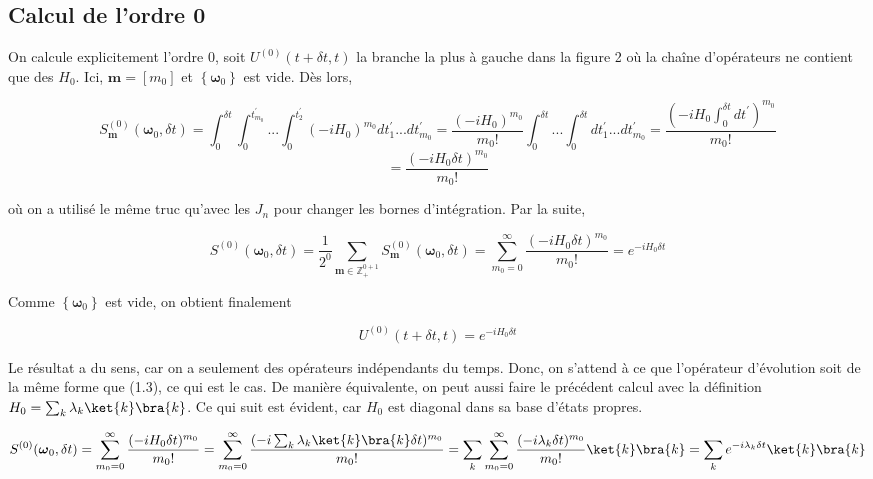 \subsection{Calcul de l'ordre 0}
On calcule explicitement l'ordre 0, soit $U^{(0)}(t+\delta t, t)$ la branche la plus à gauche dans la figure 2 où la chaîne d'opérateurs ne contient que des $H_0$. Ici, $\boldsymbol{m} = [m_0]$ et $\left\{\boldsymbol{\omega}_0\right\}$ est vide. Dès lors,

\begin{equation*}
    S^{(0)}_{\boldsymbol{m}}(\boldsymbol{\omega}_0, \delta t) = \int_{0}^{\delta t}\int_{0}^{t_{m_0}^{'}}...\int_{0}^{t_2^{'}} (-iH_0)^{m_0}dt_1^{'}...dt_{m_0}^{'} = \frac{(-iH_0)^{m_0}}{m_0!}\int_{0}^{\delta t}...\int_{0}^{\delta t}dt_1^{'}...dt_{m_0}^{'} = \frac{(-iH_0\int_{0}^{\delta t}dt^{'})^{m_0}}{m_0!}
\end{equation*}
\begin{equation*}
    = \frac{(-iH_0\delta t)^{m_0}}{m_0!}
\end{equation*}

où on a utilisé le même truc qu'avec les $J_n$ pour changer les bornes d'intégration. Par la suite,

\begin{equation*}
    S^{(0)}(\boldsymbol{\omega}_0, \delta t) = \frac{1}{2^0}\sum_{\boldsymbol{m} \in \mathbb{Z}^{0+1}_{+}}S^{(0)}_{\boldsymbol{m}}(\boldsymbol{\omega}_0, \delta t) = \sum_{m_0=0}^{\infty}\frac{(-iH_0\delta t)^{m_0}}{m_0!} = e^{-iH_0\delta t}
\end{equation*}

Comme $\left\{\boldsymbol{\omega}_0\right\}$ est vide, on obtient finalement

\begin{equation*}
    U^{(0)}(t+\delta t, t) = e^{-iH_0\delta t}
\end{equation*}

Le résultat a du sens, car on a seulement des opérateurs indépendants du temps. Donc, on s'attend à ce que l'opérateur d'évolution soit de la même forme que (1.3), ce qui est le cas. De manière équivalente, on peut aussi faire le précédent calcul avec la définition $H_0 = \sum_{k}\lambda_k \ket{k}\bra{k}$. Ce qui suit est évident, car $H_0$ est diagonal dans sa base d'états propres.

\begin{equation*}
    S^{(0)}(\boldsymbol{\omega}_0, \delta t) = \sum_{m_0 = 0}^{\infty}\frac{(-iH_0\delta t)^{m_0}}{m_0!} = \sum_{m_0 = 0}^{\infty}\frac{(-i\sum_{k}\lambda_k \ket{k}\bra{k}\delta t)^{m_0}}{m_0!} = \sum_{k}\sum_{m_0 = 0}^{\infty}\frac{(-i\lambda_k\delta t)^{m_0}}{m_0!}\ket{k}\bra{k} = \sum_{k}e^{-i\lambda_k\delta t}\ket{k}\bra{k}
\end{equation*}

